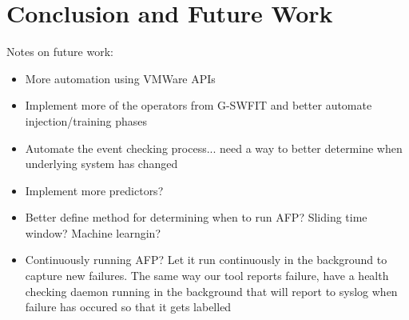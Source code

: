 \chapter{Conclusion and Future Work} \label{chapter5}
Notes on future work:

\begin{itemize}
\item{More automation using VMWare APIs}
\item{Implement more of the operators from G-SWFIT and better automate
injection/training phases}
\item{Automate the event checking process... need a way to better determine
when underlying system has changed}
\item{Implement more predictors?}
\item{Better define method for determining when to run AFP? Sliding time
window?  Machine learngin?}
\item{Continuously running AFP?  Let it run continuously in the background to
capture new failures.  The same way our tool reports failure, have a health
checking daemon running in the background that will report to syslog when
failure has occured so that it gets labelled}
\end{itemize}

